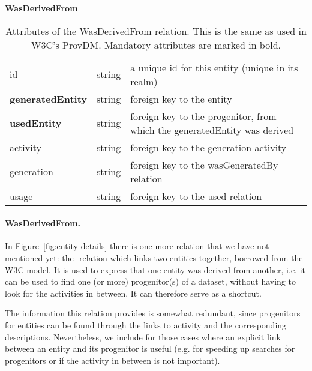 \begin{table}[h]

\small
{}\textwidth

\textbf{\normalsize WasDerivedFrom}\vspace{0.25em}\\
\begin{tabulary}{1.0\textwidth}{@{}lp{3cm}L@{}}
\toprule
{} &    & \\
\midrule
id               & string              & a unique id for this entity (unique in its realm)\\
\textbf{generatedEntity} & string      & foreign key to the entity\\
\textbf{usedEntity}      & string      & foreign key to the progenitor, from which the generatedEntity was derived\\
activity         & string              & foreign key to the generation activity\\
generation       & string              & foreign key to the wasGeneratedBy relation\\
usage            & string              & foreign key to the used relation\\
\bottomrule
\end{tabulary}
\caption{Attributes of the WasDerivedFrom relation. This is the same as used in W3C's ProvDM. Mandatory attributes are marked in bold.
}\label{tab:wasderivedfrom-attributes}
\end{table}


\paragraph{WasDerivedFrom.}
In Figure~\ref{fig:entity-details} there is one more relation that we have not mentioned yet: 
the -relation which links two entities together, borrowed from the W3C model. 
It is used to express that 
one entity was derived from another, i.e. it can be used to find one (or more) progenitor(s) 
of a dataset, without having to look for the activities in between. It can therefore serve as 
a shortcut.

The information this relation provides is somewhat redundant, since progenitors for entities
can be found through the links to activity and the corresponding descriptions.
Nevertheless, we include  for those cases where an explicit 
link between an entity and its progenitor is useful (e.g. for speeding up searches for 
progenitors or if the activity in between is not important).

